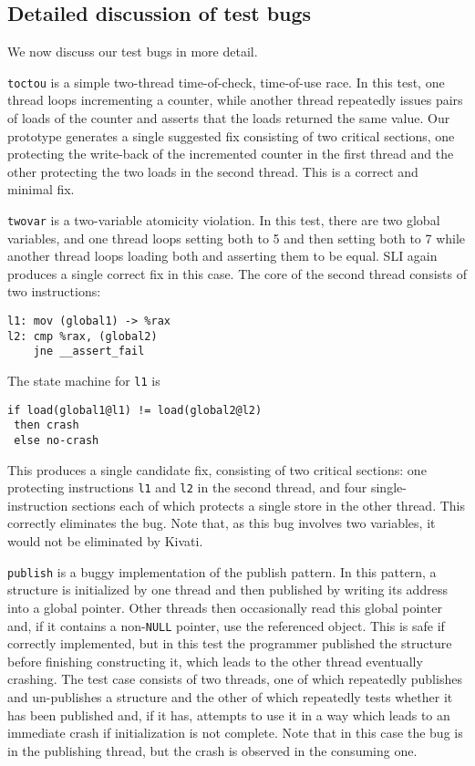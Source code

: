 \documentclass[10pt,twocolumn,preprint,natbib,authoryear]{sigplanconf}
\begin{document}
\subsection{Detailed discussion of test bugs}
\label{sect:bug_descr}

We now discuss our test bugs in more detail.

\verb|toctou| is a simple two-thread time-of-check, time-of-use race.
In this test, one thread loops incrementing a counter, while another
thread repeatedly issues pairs of loads of the counter and asserts
that the loads returned the same value.  Our prototype generates a
single suggested fix consisting of two critical sections, one
protecting the write-back of the incremented counter in the first
thread and the other protecting the two loads in the second thread.
This is a correct and minimal fix.

\verb|twovar| is a two-variable atomicity violation.  In this test,
there are two global variables, and one thread loops setting both to 5
and then setting both to 7 while another thread loops loading both and
asserting them to be equal.  SLI again produces a single correct fix
in this case.  The core of the second thread consists of two
instructions:

\begin{verbatim}
l1: mov (global1) -> %rax
l2: cmp %rax, (global2)
    jne __assert_fail
\end{verbatim}

The state machine for \verb|l1| is

\begin{verbatim}
if load(global1@l1) != load(global2@l2)
 then crash
 else no-crash
\end{verbatim}

\noindent
This produces a single candidate fix, consisting of two critical
sections: one protecting instructions \verb|l1| and \verb|l2| in the
second thread, and four single-instruction sections each of which
protects a single store in the other thread.  This correctly
eliminates the bug.  Note that, as this bug involves two variables, it
would not be eliminated by Kivati\cite{Chew2010a}.

\verb|publish| is a buggy implementation of the publish pattern.  In
this pattern, a structure is initialized by one thread and then
published by writing its address into a global pointer.  Other threads
then occasionally read this global pointer and, if it contains a
non-\verb|NULL| pointer, use the referenced object.  This is safe if
correctly implemented, but in this test the programmer published the
structure before finishing constructing it, which leads to the other
thread eventually crashing.  The test case consists of two threads,
one of which repeatedly publishes and un-publishes a structure and the
other of which repeatedly tests whether it has been published and, if
it has, attempts to use it in a way which leads to an immediate crash
if initialization is not complete.  Note that in this case the bug is
in the publishing thread, but the crash is observed in the consuming
one.
\end{document}
